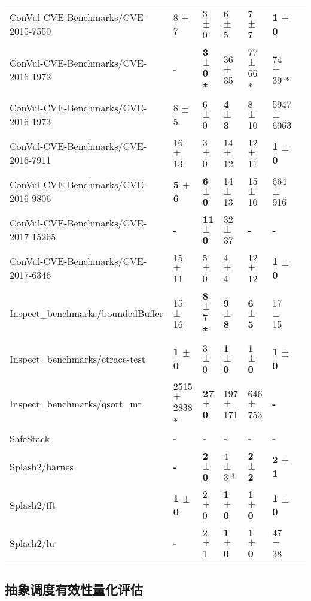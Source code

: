 \begin{table}
\begin{spacing}{1.5}
\begin{tabular}{lllllll}
ConVul-CVE-Benchmarks/CVE-2015-7550 & 8  $\pm$ 7  & 3  $\pm$ 0  & 6  $\pm$ 5  & 7  $\pm$ 7  & \textbf{ 1  $\pm$ 0  } \\
ConVul-CVE-Benchmarks/CVE-2016-1972 & \textbf{ - } & \textbf{ 3  $\pm$ 0 * } & 36  $\pm$ 35  & 77  $\pm$ 66 * & 74  $\pm$ 39 *  \\
ConVul-CVE-Benchmarks/CVE-2016-1973 & 8  $\pm$ 5  & 6  $\pm$ 0  & \textbf{ 4  $\pm$ 3  } & 8  $\pm$ 10  & 5947  $\pm$ 6063   \\
ConVul-CVE-Benchmarks/CVE-2016-7911 & 16  $\pm$ 13  & 3  $\pm$ 0  & 14  $\pm$ 12  & 12  $\pm$ 11  & \textbf{ 1  $\pm$ 0  }  \\
ConVul-CVE-Benchmarks/CVE-2016-9806 & \textbf{ 5  $\pm$ 6  } & \textbf{ 6  $\pm$ 0  } & 14  $\pm$ 13  & 15  $\pm$ 10  & 664  $\pm$ 916   \\
ConVul-CVE-Benchmarks/CVE-2017-15265 & \textbf{ - } & \textbf{ 11  $\pm$ 0  } & 32  $\pm$ 37  & \textbf{ - } & \textbf{ - }  \\
ConVul-CVE-Benchmarks/CVE-2017-6346 & 15  $\pm$ 11  & 5  $\pm$ 0  & 4  $\pm$ 4  & 12  $\pm$ 12  & \textbf{ 1  $\pm$ 0  }  \\
Inspect\_benchmarks/boundedBuffer & 15  $\pm$ 16  & \textbf{ 8  $\pm$ 7 * } & \textbf{ 9  $\pm$ 8  } & \textbf{ 6  $\pm$ 5  } & 17  $\pm$ 15   \\
Inspect\_benchmarks/ctrace-test & \textbf{ 1  $\pm$ 0  } & 3  $\pm$ 0  & \textbf{ 1  $\pm$ 0  } & \textbf{ 1  $\pm$ 0  } & \textbf{ 1  $\pm$ 0  }  \\
Inspect\_benchmarks/qsort\_mt & 2515  $\pm$ 2838 * & \textbf{ 27  $\pm$ 0  } & 197  $\pm$ 171  & 646  $\pm$ 753  & \textbf{ - }  \\
SafeStack & \textbf{ - } & \textbf{ - } & \textbf{ - } & \textbf{ - } & \textbf{ - }  \\
Splash2/barnes & \textbf{ - } & \textbf{ 2  $\pm$ 0  } & 4  $\pm$ 3 * & \textbf{ 2  $\pm$ 2  } & \textbf{ 2  $\pm$ 1  }  \\
Splash2/fft & \textbf{ 1  $\pm$ 0  } & 2  $\pm$ 0  & \textbf{ 1  $\pm$ 0  } & \textbf{ 1  $\pm$ 0  } & \textbf{ 1  $\pm$ 0  } \\
Splash2/lu & \textbf{ - } & 2  $\pm$ 1  & \textbf{ 1  $\pm$ 0  } & \textbf{ 1  $\pm$ 0  } & 47  $\pm$ 38   \\
\bottomrule
\end{tabular}
\end{spacing}
\end{table}


\subsection{抽象调度有效性量化评估}

